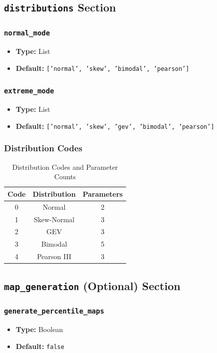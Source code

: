 \documentclass[12pt,a4paper]{article}
\begin{document}
\subsection{\texttt{distributions} Section}
\subsubsection{\texttt{normal\_mode}}
\begin{itemize}[leftmargin=*]
    \item \textbf{Type:} List
    \item \textbf{Default:} \texttt{['normal', 'skew', 'bimodal', 'pearson']}
\end{itemize}
\subsubsection{\texttt{extreme\_mode}}
\begin{itemize}[leftmargin=*]
    \item \textbf{Type:} List
    \item \textbf{Default:} \texttt{['normal', 'skew', 'gev', 'bimodal', 'pearson']}
\end{itemize}
\subsubsection*{Distribution Codes}
\begin{table}[h!]
\centering
\begin{tabular}{|c|c|c|}
\hline
\textbf{Code} & \textbf{Distribution} & \textbf{Parameters} \\
\hline
0 & Normal & 2 \\
1 & Skew-Normal & 3 \\
2 & GEV & 3 \\
3 & Bimodal & 5 \\
4 & Pearson III & 3 \\
\hline
\end{tabular}
\caption{Distribution Codes and Parameter Counts}
\end{table}

\subsection{\texttt{map\_generation} (Optional) Section}
\subsubsection{\texttt{generate\_percentile\_maps}}
\begin{itemize}[leftmargin=*]
    \item \textbf{Type:} Boolean
    \item \textbf{Default:} \texttt{false}
\end{itemize}
\end{document}
